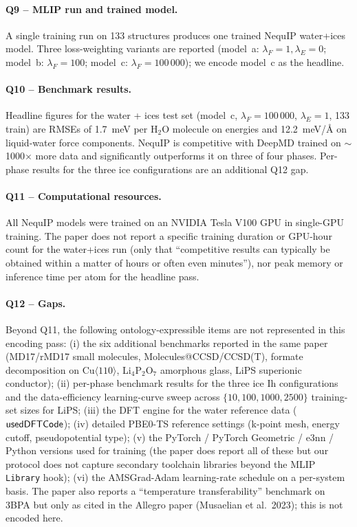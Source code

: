 \paragraph{Q9 -- MLIP run and trained model.}
A single training run on 133 structures produces one trained
NequIP water+ices model. Three loss-weighting variants are reported
(model~a: $\lambda_F=1,\lambda_E=0$; model~b: $\lambda_F=100$;
model~c: $\lambda_F=100\,000$); we encode model~c as the headline.


\paragraph{Q10 -- Benchmark results.}
Headline figures for the water + ices test set (model~c,
$\lambda_F=100\,000$, $\lambda_E=1$, 133 train) are RMSEs of
1.7~meV per H$_2$O molecule on energies and 12.2~meV/\AA{} on
liquid-water force components. NequIP is competitive with DeepMD
trained on $\sim$1000$\times$ more data and significantly
outperforms it on three of four phases. Per-phase results for the
three ice configurations are an additional Q12 gap.


\paragraph{Q11 -- Computational resources.}
All NequIP models were trained on an NVIDIA Tesla V100 GPU in
single-GPU training. The paper does not report a specific training
duration or GPU-hour count for the water+ices run (only that
``competitive results can typically be obtained within a matter of
hours or often even minutes''), nor peak memory or inference time
per atom for the headline pass.


\paragraph{Q12 -- Gaps.}
Beyond Q11, the following ontology-expressible items are not
represented in this encoding pass: (i) the six additional
benchmarks reported in the same paper (MD17/rMD17 small molecules,
Molecules@CCSD/CCSD(T), formate decomposition on Cu$\langle 110
\rangle$, Li$_4$P$_2$O$_7$ amorphous glass, LiPS superionic
conductor); (ii) per-phase benchmark results for the three ice Ih
configurations and the data-efficiency learning-curve sweep across
$\{10, 100, 1000, 2500\}$ training-set sizes for LiPS; (iii) the
DFT engine for the water reference data ($\mathsf{usedDFTCode}$);
(iv) detailed PBE0-TS reference settings (k-point mesh, energy
cutoff, pseudopotential type); (v) the PyTorch / PyTorch
Geometric / e3nn / Python versions used for training (the paper
does report all of these but our protocol does not capture
secondary toolchain libraries beyond the MLIP \texttt{Library}
hook); (vi) the AMSGrad-Adam learning-rate schedule on a per-system
basis. The paper also reports a ``temperature transferability''
benchmark on 3BPA but only as cited in
the Allegro paper (Musaelian et al.~2023); this is not encoded here.
